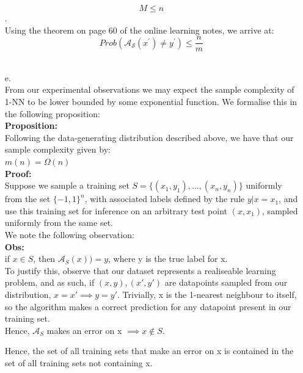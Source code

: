 \documentclass[12pt]{article}
\begin{document}
\begin{itemize}
    \[M \le n \].\\

    Using the theorem on page 60 of the online learning notes, we arrive at:\\

    \[Prob(\mathcal{A_{S}}(x ^{\prime}) \ne y^{\prime} ) \le \frac{n}{m}\]\\

\newpage

     \item[e.]\\
     From our experimental observations we may expect the sample complexity of 1-NN
     to be lower bounded by some exponential function. We formalise this in the
     following proposition:\\

    \textbf{Proposition:}\\

    Following the data-generating distribution described above, we have that our sample complexity given by:\\

    $m(n) = \Omega (n)$ \\
    \textbf{Proof:}\\

    Suppose we sample a training set $S = \{(x_{1},y_{1}), \dots, (x_{n},y_{n})\} $ uniformly from the set $\{-1,1\}^{n}$, with associated labels
    defined by the rule $y | x = x_{1}$, and use this training set for inference on an
     arbitrary test point $(x,x_{1})$, sampled uniformly from the same set.
    \\
    We note the following observation:\\

    \textbf{Obs:}\\
    if $x \in S$, then $\mathcal{A}_{S}(x)) = y$, where y is the true label for x. \\

    To justify this, observe that our dataset represents a realiseable learning problem,
    and as such, if $(x,y), (x \prime,y \prime)$ are datapoints sampled from our distribution,
    $x = x \prime \implies y = y \prime $. Trivially, x is the 1-nearest neighbour to itself,
    so the algorithm makes a correct prediction for any datapoint present in our training set.\\

    Hence, $\mathcal{A}_{S}$ makes an error on x $\implies x \notin S$.
    
    Hence, the set of all training sets that make an error on x is contained in the set of all
    training sets not containing x. \\


\end{itemize}
\end{document}
